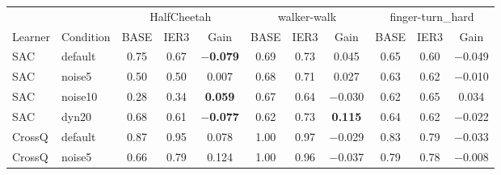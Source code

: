 \setlength{\tabcolsep}{4pt}
\begin{tabular}{llccccccccc}
\toprule
 & & \multicolumn{3}{c}{HalfCheetah} & \multicolumn{3}{c}{walker-walk} & \multicolumn{3}{c}{finger-turn\_hard} \\
\cmidrule(lr){3-5}\cmidrule(lr){6-8}\cmidrule(lr){9-11}
Learner & Condition & BASE & IER3 & Gain & BASE & IER3 & Gain & BASE & IER3 & Gain \\
\midrule
SAC & default & 0.75 & 0.67 & \textbf{$-$0.079} & 0.69 & 0.73 & 0.045 & 0.65 & 0.60 & $-$0.049 \\
SAC & noise5 & 0.50 & 0.50 & 0.007 & 0.68 & 0.71 & 0.027 & 0.63 & 0.62 & $-$0.010 \\
SAC & noise10 & 0.28 & 0.34 & \textbf{0.059} & 0.67 & 0.64 & $-$0.030 & 0.62 & 0.65 & 0.034 \\
SAC & dyn20 & 0.68 & 0.61 & \textbf{$-$0.077} & 0.62 & 0.73 & \textbf{0.115} & 0.64 & 0.62 & $-$0.022 \\
\midrule
CrossQ & default & 0.87 & 0.95 & 0.078 & 1.00 & 0.97 & $-$0.029 & 0.83 & 0.79 & $-$0.033 \\
CrossQ & noise5 & 0.66 & 0.79 & 0.124 & 1.00 & 0.96 & $-$0.037 & 0.79 & 0.78 & $-$0.008 \\
\bottomrule
\end{tabular}
